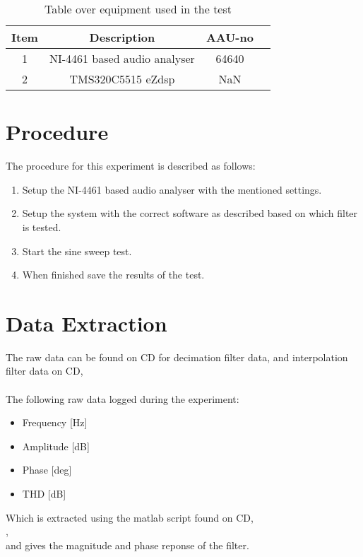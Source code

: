 \begin{table}[H]
\centering
{}
\begin{tabular}{S[table-format=1]ccc} \toprule
    {Item} & {Description} & {AAU-no} \\       &  NI-4461 based audio analyser  & 64640  \\ 
    2      &  TMS320C5515 eZdsp  & NaN  \\  \bottomrule 
\end{tabular}
\caption{Table over equipment used in the test}
\label{tab:UsedEquipmentDecimation}
\end{table}
\vspace{-5mm}


\section{Procedure}
The procedure for this experiment is described as follows:
\vspace{-5mm}
\begin{enumerate}
\item Setup the NI-4461 based audio analyser with the mentioned settings.
\item Setup the system with the correct software as described based on which filter is tested.
\item Start the sine sweep test.
\item When finished save the results of the test.
\end{enumerate}

\section{Data Extraction}
The raw data can be found on CD for decimation filter data, and interpolation filter data on CD, \\
   \\ 
The following raw data logged during the experiment:
\begin{itemize}
\item Frequency [Hz]
\item Amplitude [dB]
\item Phase 	[deg]
\item THD 		[dB]
\end{itemize} 
Which is extracted using the matlab script found on CD, \\
,  \\
and gives the magnitude and phase reponse of the filter.
